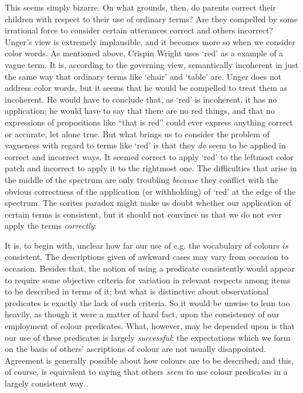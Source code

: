 \documentclass[11pt]{article}
\newenvironment{squote}{%
       \begin{spacing}{1}
       \begin{list}{}{%
       \setlength{\labelwidth}{0pt}%
       \rightmargin\leftmargin%
       }
       \item\relax
       }{%
       \end{list}%
       \end{spacing}
}
\begin{document}
\begin{spacing}{1}
This seems simply bizarre.  On what grounds, then, do parents correct
their children with respect to their use of ordinary terms?  Are they
compelled by some irrational force to consider certain utterances
correct and others incorrect?  Unger's view is extremely implausible,
and it becomes more so when we consider color words.  As mentioned
above, Crispin Wright uses `red' as a example of a vague term.  It is,
according to the governing view, semantically incoherent in just the
same way that ordinary terms like `chair' and `table' are.  Unger does
not address color words, but it seems that he would be compelled to
treat them as incoherent.  He would have to conclude that, as `red' is
incoherent, it has no application; he would have to say that there are
no red things, and that no expressions of propositions like ``that is
red'' could ever express anything correct or accurate, let alone true.
But what brings us to consider the problem of vagueness with regard to
terms like `red' is that they \emph{do} seem to be applied in correct
and incorrect ways.  It seemed correct to apply `red' to the leftmost
color patch and incorrect to apply it to the rightmost one.  The
difficulties that arise in the middle of the spectrum are only
troubling \emph{because} they conflict with the obvious correctness of
the application (or withholding) of `red' at the edge of the spectrum.
The sorites paradox might make us doubt whether our application of
certain terms is consistent, but it should not convince us that we do
not ever apply the terms \emph{correctly}:

\begin{squote}
It is, to begin with, unclear how far our use of e.g. the vocabulary
  of colours \emph{is} consistent.  The descriptions given of awkward cases
  may vary from occasion to occasion.  Besides that, the notion of
  using a predicate consistently would appear to require some
  objective criteria for variation in relevant respects among items to
  be described in terms of it; but what is distinctive about
  observational predicates is exactly the lack of such criteria.  So
  it would be unwise to lean too heavily, as though it were a matter
  of hard fact, upon the consistency of our employment of colour
  predicates.  What, however, may be depended upon is that our use of
  these predicates is largely \emph{successful}; the expectations which we
  form on the basis of others' ascriptions of colour are not usually
  disappointed.  Agreement is generally possible about how colours are
  to be described; and this, of course, is equivalent to saying that
  others \emph{seem} to use colour predicates in a largely consistent way
  \citep[361]{wright1975}.
\end{squote}


\end{spacing}
\end{document}
